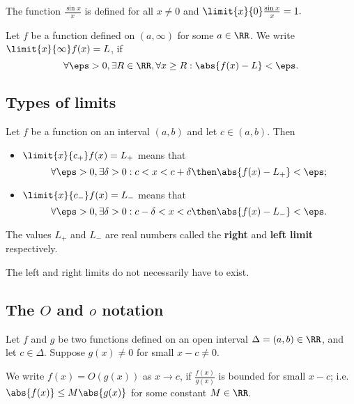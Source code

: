 \documentclass[12pt, a4paper]{article}
\begin{document}
\begin{example}
    The function \(\frac{\sin x}{x}\) is defined for all \(x\neq 0\) and \(\limit{x}{0} \frac{\sin x}{x}=1.\)
\end{example}

\begin{definition}
    Let \(f\) be a function defined on \((a,\infty)\) for some \(a\in \RR\). We write \(\limit{x}{\infty} f(x) =L\), if
    \[\forall \eps>0, \exists R\in \RR, \forall x \geq R : \abs{f(x)-L}<\eps.\]
\end{definition}

\subsection{Types of limits}

\begin{definition}
    Let \(f\) be a function on an interval \((a,b)\) and let \(c \in (a,b)\). Then
    \begin{itemize}
        \item \(\limit{x}{{c}_+} f(x)=L_+\) means that \[\forall \eps>0, \exists \delta>0 : c<x<c+\delta \then \abs{f(x)-L_+}<\eps;\]
        \item \(\limit{x}{{c}_-} f(x)=L_-\) means that \[\forall \eps>0, \exists \delta>0 : c-\delta<x<c \then \abs{f(x)-L_-}<\eps.\]
    \end{itemize}
    The values \(L_+\) and \(L_-\) are real numbers called the \textbf{right} and \textbf{left limit} respectively.
\end{definition}

\begin{mdremark}
    The left and right limits do not necessarily have to exist.
\end{mdremark}

\subsection{The \texorpdfstring{\(O\)}{TEXT} and \texorpdfstring{\(o\)}{TEXT} notation}

Let \(f\) and \(g\) be two functions defined on an open interval \(\Delta=(a,b) \in \RR\), and let \(c \in \Delta\). Suppose \(g(x)\neq 0\) for small \(x-c\neq 0.\)

\begin{definition}
    We write \(f(x)=O(g(x))\) as \(x\to c\), if \(\frac{f(x)}{g(x)}\) is bounded for small \(x-c\); i.e. \(\abs{f(x)} \leq M\abs{g(x)}\) for some constant \(M \in \RR\).
\end{definition}
\end{document}
